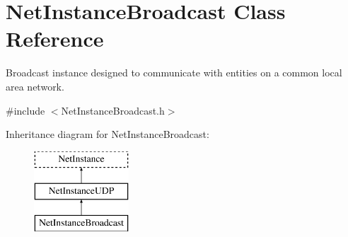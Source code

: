 \hypertarget{class_net_instance_broadcast}{
\section{NetInstanceBroadcast Class Reference}
\label{class_net_instance_broadcast}
}


Broadcast instance designed to communicate with entities on a common local area network.  




{\ttfamily \#include $<$NetInstanceBroadcast.h$>$}

Inheritance diagram for NetInstanceBroadcast:\begin{figure}[H]
\begin{center}
\leavevmode
\includegraphics[height=3.000000cm]{class_net_instance_broadcast}
\end{center}
\end{figure}
